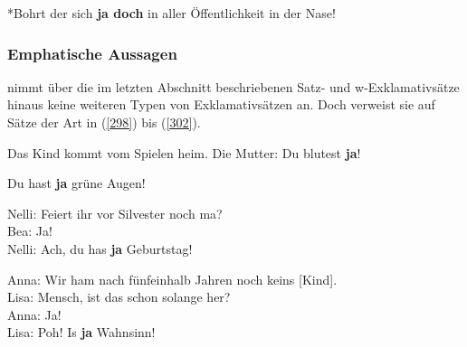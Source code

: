 \begin{exe}
	\ex\label{297} 
	*Bohrt der sich \textbf{ja doch} in aller Öffentlichkeit in der Nase!  
	\hfill\hbox {\citet[235]{Rinas2006}}
\end{exe}

\subsubsection{Emphatische Aussagen}
\label{sec:empha}
\citet{Thurmair1989} nimmt über die im letzten Abschnitt beschriebenen Satz- und w-Exklamativsätze hinaus keine weiteren Typen von Exklamativsätzen an. Doch verweist sie auf Sätze der Art  in (\ref{298}) bis (\ref{302}).

\begin{exe}
	\ex\label{298} 
	Das Kind kommt vom Spielen heim. Die Mutter: \glqq Du blutest \textbf{ja}!\grqq{}
\end{exe}

\begin{exe}
	\ex\label{299} 
	Du hast \textbf{ja} grüne Augen!
\end{exe}	

\begin{exe}
	\ex\label{300} 
	Nelli: Feiert ihr vor Silvester noch ma?\\
	Bea: Ja!\\
	Nelli: Ach, du has \textbf{ja} Geburtstag!
\end{exe}	

\begin{exe}
	\ex\label{301} 
	Anna: Wir ham nach fünfeinhalb Jahren noch keins [Kind].\\
	Lisa: Mensch, ist das schon solange her?\\
	Anna: Ja!\\
	Lisa: Poh! Is \textbf{ja} Wahnsinn!
\end{exe}	
	
